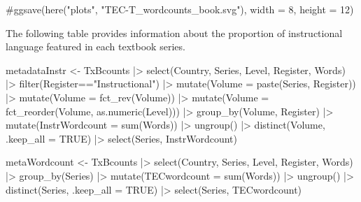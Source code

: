 \documentclass[
  letterpaper,
  DIV=11,
  numbers=noendperiod]{scrreprt}
\newenvironment{Shaded}{\begin{snugshade}}{\end{snugshade}}
\newcommand{\AttributeTok}[1]{\textcolor[rgb]{0.40,0.45,0.13}{#1}}
\newcommand{\CommentTok}[1]{\textcolor[rgb]{0.37,0.37,0.37}{#1}}
\newcommand{\ConstantTok}[1]{\textcolor[rgb]{0.56,0.35,0.01}{#1}}
\newcommand{\FunctionTok}[1]{\textcolor[rgb]{0.28,0.35,0.67}{#1}}
\newcommand{\NormalTok}[1]{\textcolor[rgb]{0.00,0.23,0.31}{#1}}
\newcommand{\OtherTok}[1]{\textcolor[rgb]{0.00,0.23,0.31}{#1}}
\newcommand{\SpecialCharTok}[1]{\textcolor[rgb]{0.37,0.37,0.37}{#1}}
\newcommand{\StringTok}[1]{\textcolor[rgb]{0.13,0.47,0.30}{#1}}
\begin{document}
\begin{Shaded}
\begin{Highlighting}[]
\CommentTok{\#ggsave(here("plots", "TEC{-}T\_wordcounts\_book.svg"), width = 8, height = 12)}
\end{Highlighting}
\end{Shaded}

The following table provides information about the proportion of
instructional language featured in each textbook series.

\begin{Shaded}
\begin{Highlighting}[]
\NormalTok{metadataInstr }\OtherTok{\textless{}{-}}\NormalTok{ TxBcounts }\SpecialCharTok{|\textgreater{}}  
  \FunctionTok{select}\NormalTok{(Country, Series, Level, Register, Words) }\SpecialCharTok{|\textgreater{}}  
  \FunctionTok{filter}\NormalTok{(Register}\SpecialCharTok{==}\StringTok{"Instructional"}\NormalTok{) }\SpecialCharTok{|\textgreater{}}  
  \FunctionTok{mutate}\NormalTok{(}\AttributeTok{Volume =} \FunctionTok{paste}\NormalTok{(Series, Register)) }\SpecialCharTok{|\textgreater{}}  
  \FunctionTok{mutate}\NormalTok{(}\AttributeTok{Volume =} \FunctionTok{fct\_rev}\NormalTok{(Volume)) }\SpecialCharTok{|\textgreater{}}  
  \FunctionTok{mutate}\NormalTok{(}\AttributeTok{Volume =} \FunctionTok{fct\_reorder}\NormalTok{(Volume, }\FunctionTok{as.numeric}\NormalTok{(Level))) }\SpecialCharTok{|\textgreater{}}  
  \FunctionTok{group\_by}\NormalTok{(Volume, Register) }\SpecialCharTok{|\textgreater{}}  
  \FunctionTok{mutate}\NormalTok{(}\AttributeTok{InstrWordcount =} \FunctionTok{sum}\NormalTok{(Words)) }\SpecialCharTok{|\textgreater{}}  
  \FunctionTok{ungroup}\NormalTok{() }\SpecialCharTok{|\textgreater{}}  
  \FunctionTok{distinct}\NormalTok{(Volume, }\AttributeTok{.keep\_all =} \ConstantTok{TRUE}\NormalTok{) }\SpecialCharTok{|\textgreater{}}  
  \FunctionTok{select}\NormalTok{(Series, InstrWordcount)}

\NormalTok{metaWordcount }\OtherTok{\textless{}{-}}\NormalTok{ TxBcounts }\SpecialCharTok{|\textgreater{}}  
  \FunctionTok{select}\NormalTok{(Country, Series, Level, Register, Words) }\SpecialCharTok{|\textgreater{}}  
  \FunctionTok{group\_by}\NormalTok{(Series) }\SpecialCharTok{|\textgreater{}}  
  \FunctionTok{mutate}\NormalTok{(}\AttributeTok{TECwordcount =} \FunctionTok{sum}\NormalTok{(Words)) }\SpecialCharTok{|\textgreater{}}  
  \FunctionTok{ungroup}\NormalTok{() }\SpecialCharTok{|\textgreater{}}  
  \FunctionTok{distinct}\NormalTok{(Series, }\AttributeTok{.keep\_all =} \ConstantTok{TRUE}\NormalTok{) }\SpecialCharTok{|\textgreater{}}  
  \FunctionTok{select}\NormalTok{(Series, TECwordcount)}


\end{Highlighting}
\end{Shaded}
\end{document}

